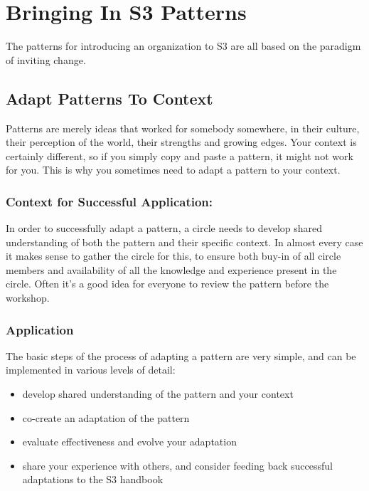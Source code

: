 \chapter{Bringing In S3 Patterns}
\label{bringingins3patterns}

The patterns for introducing an organization to S3 are all based on the paradigm of inviting change.

\section{Adapt Patterns To Context}
\label{adaptpatternstocontext}

Patterns are merely ideas that worked for somebody somewhere, in their culture, their perception of the world, their strengths and growing edges. Your context is certainly different, so if you simply copy and paste a pattern, it might not work for you. This is why you sometimes need to adapt a pattern to your context.

\subsection{Context for Successful Application:}
\label{contextforsuccessfulapplication:}

In order to successfully adapt a pattern, a circle needs to develop shared understanding of both the pattern and their specific context. In almost every case it makes sense to gather the circle for this, to ensure both buy-in of all circle members and availability of all the knowledge and experience present in the circle. Often it's a good idea for everyone to review the pattern before the workshop.

\subsection{Application}
\label{application}

The basic steps of the process of adapting a pattern are very simple, and can be implemented in various levels of detail:

\begin{itemize}
\item develop shared understanding of the pattern and your context

\item co-create an adaptation of the pattern

\item evaluate effectiveness and evolve your adaptation

\item share your experience with others, and consider feeding back successful adaptations to the S3 handbook

\end{itemize}

